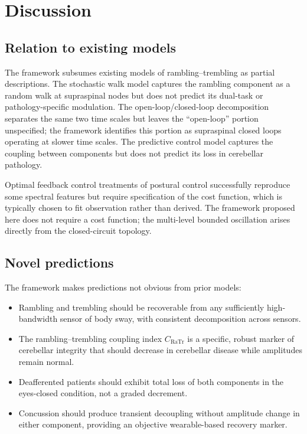 \documentclass[11pt,twocolumn,a4paper]{article}
\theoremstyle{definition}
\theoremstyle{remark}
\newcommand{\Ra}{\mathrm{Ra}}
\newcommand{\Tr}{\mathrm{Tr}}
\begin{document}
\section{Discussion}
\label{sec:discussion}

\subsection{Relation to existing models}

The framework subsumes existing models of rambling--trembling as
partial descriptions. The stochastic walk model \citep{collins1993,%
chow2000} captures the rambling component as a random walk at
supraspinal nodes but does not predict its dual-task or
pathology-specific modulation. The open-loop/closed-loop
decomposition \citep{collins1994} separates the same two time
scales but leaves the ``open-loop'' portion unspecified; the
framework identifies this portion as supraspinal closed loops
operating at slower time scales. The predictive control model
\citep{peterka2002,jeka2004} captures the coupling between
components but does not predict its loss in cerebellar pathology.

Optimal feedback control treatments of postural control
\citep{kuo1995,peterka2002} successfully reproduce some spectral
features but require specification of the cost function, which is
typically chosen to fit observation rather than derived. The
framework proposed here does not require a cost function; the
multi-level bounded oscillation arises directly from the
closed-circuit topology.

\subsection{Novel predictions}

The framework makes predictions not obvious from prior models:
\begin{itemize}[leftmargin=*,itemsep=1pt]
\item Rambling and trembling should be recoverable from any
sufficiently high-bandwidth sensor of body sway, with consistent
decomposition across sensors.
\item The rambling--trembling coupling index $C_{\Ra\Tr}$ is a
specific, robust marker of cerebellar integrity that should
decrease in cerebellar disease while amplitudes remain normal.
\item Deafferented patients should exhibit total loss of both
components in the eyes-closed condition, not a graded decrement.
\item Concussion should produce transient decoupling without
amplitude change in either component, providing an objective
wearable-based recovery marker.
\end{itemize}
\end{document}
